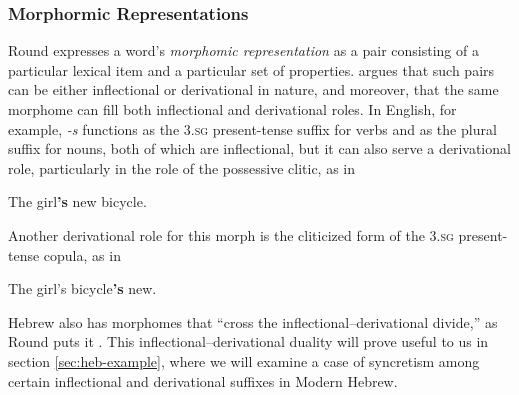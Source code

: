 \subsubsection{Morphormic Representations}
Round expresses a word's \emph{morphomic representation} as a pair 
consisting of a particular lexical item and a particular set of properties.
\citet{round:2011} argues that such pairs can be either inflectional 
 or derivational in nature, and moreover, that the same morphome can fill 
 both inflectional and derivational roles. In English, for example, \emph{-s} 
functions as the \textsc{3.sg} present-tense suffix for verbs and as the plural
 suffix for nouns, both of which are inflectional, but it can also serve a derivational 
role, particularly in the role of the possessive clitic, as in
\begin{exe}
\ex The girl\textbf{'s} new bicycle.
\end{exe}
Another derivational role for this morph is the cliticized form of the \textsc{3.sg} present-tense copula, as in
\begin{exe}
\ex The girl's bicycle\textbf{'s} new. 
\end{exe}


 Hebrew also has morphomes that ``cross the inflectional--derivational divide,'' 
 as Round puts it \citep[][p.14]{round:2015}. This inflectional--derivational 
 duality will prove useful to us in section \ref{sec:heb-example}, where we will 
 examine a case of syncretism among certain inflectional and derivational suffixes in Modern Hebrew.
  
